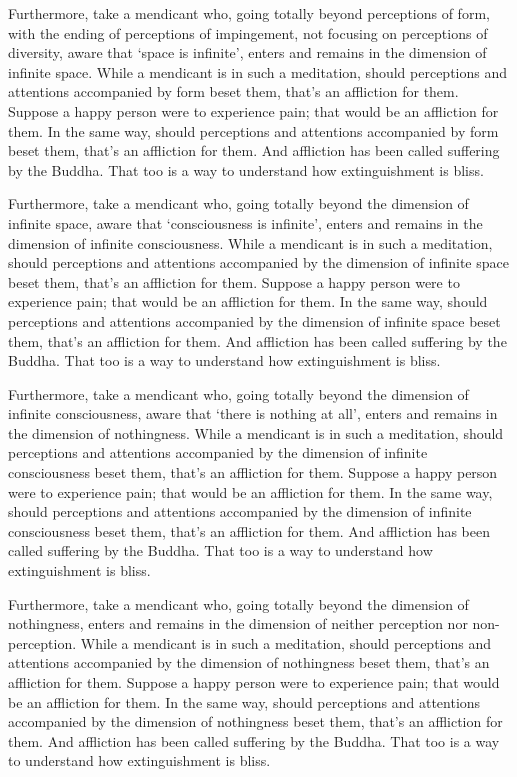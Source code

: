 \documentclass[12pt,openany]{book}%
\begin{document}
Furthermore, take a mendicant who, going totally beyond perceptions of form, with the ending of perceptions of impingement, not focusing on perceptions of diversity, aware that ‘space is infinite’, enters and remains in the dimension of infinite space. While a mendicant is in such a meditation, should perceptions and attentions accompanied by form beset them, that’s an affliction for them. Suppose a happy person were to experience pain; that would be an affliction for them. In the same way, should perceptions and attentions accompanied by form beset them, that’s an affliction for them. And affliction has been called suffering by the Buddha. That too is a way to understand how extinguishment is bliss. 

Furthermore, take a mendicant who, going totally beyond the dimension of infinite space, aware that ‘consciousness is infinite’, enters and remains in the dimension of infinite consciousness. While a mendicant is in such a meditation, should perceptions and attentions accompanied by the dimension of infinite space beset them, that’s an affliction for them. Suppose a happy person were to experience pain; that would be an affliction for them. In the same way, should perceptions and attentions accompanied by the dimension of infinite space beset them, that’s an affliction for them. And affliction has been called suffering by the Buddha. That too is a way to understand how extinguishment is bliss. 

Furthermore, take a mendicant who, going totally beyond the dimension of infinite consciousness, aware that ‘there is nothing at all’, enters and remains in the dimension of nothingness. While a mendicant is in such a meditation, should perceptions and attentions accompanied by the dimension of infinite consciousness beset them, that’s an affliction for them. Suppose a happy person were to experience pain; that would be an affliction for them. In the same way, should perceptions and attentions accompanied by the dimension of infinite consciousness beset them, that’s an affliction for them. And affliction has been called suffering by the Buddha. That too is a way to understand how extinguishment is bliss. 

Furthermore, take a mendicant who, going totally beyond the dimension of nothingness, enters and remains in the dimension of neither perception nor non-perception. While a mendicant is in such a meditation, should perceptions and attentions accompanied by the dimension of nothingness beset them, that’s an affliction for them. Suppose a happy person were to experience pain; that would be an affliction for them. In the same way, should perceptions and attentions accompanied by the dimension of nothingness beset them, that’s an affliction for them. And affliction has been called suffering by the Buddha. That too is a way to understand how extinguishment is bliss. 
\end{document}
